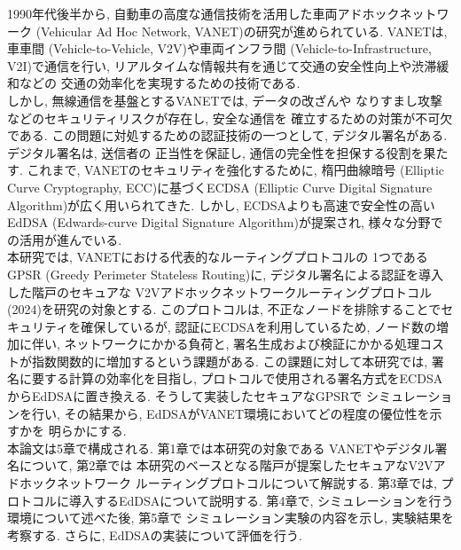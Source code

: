 1990年代後半から, 自動車の高度な通信技術を活用した車両アドホックネットワーク
 (Vehicular Ad Hoc Network, VANET)の研究が進められている. 
VANETは, 車車間 (Vehicle-to-Vehicle, V2V)や車両インフラ間
 (Vehicle-to-Infrastructure, V2I)で通信を行い, 
リアルタイムな情報共有を通じて交通の安全性向上や渋滞緩和などの
交通の効率化を実現するための技術である. \\
\indent しかし, 無線通信を基盤とするVANETでは, データの改ざんや
なりすまし攻撃などのセキュリティリスクが存在し, 安全な通信を
確立するための対策が不可欠である. この問題に対処するための認証技術の一つとして, 
デジタル署名がある. デジタル署名は, 送信者の
正当性を保証し, 通信の完全性を担保する役割を果たす. これまで, 
VANETのセキュリティを強化するために, 楕円曲線暗号 
(Elliptic Curve Cryptography, ECC)に基づくECDSA 
(Elliptic Curve Digital Signature Algorithm)が広く用いられてきた\cite{ravi}. 
しかし, ECDSAよりも高速で安全性の高いEdDSA 
(Edwards-curve Digital Signature Algorithm)が提案され, 
様々な分野での活用が進んでいる. \\
\indent 本研究では, VANETにおける代表的なルーティングプロトコルの
1つであるGPSR (Greedy Perimeter Stateless Routing)に, 
デジタル署名による認証を導入した階戸のセキュアな
V2Vアドホックネットワークルーティングプロトコル (2024)を研究の対象とする. 
このプロトコルは, 不正なノードを排除することでセキュリティを確保しているが, 
認証にECDSAを利用しているため, ノード数の増加に伴い, ネットワークにかかる負荷と, 
署名生成および検証にかかる処理コストが指数関数的に増加するという課題がある. 
この課題に対して本研究では, 署名に要する計算の効率化を目指し,  
プロトコルで使用される署名方式をECDSAからEdDSAに置き換える. そうして実装したセキュアなGPSRで
シミュレーションを行い, その結果から, EdDSAがVANET環境においてどの程度の優位性を示すかを
明らかにする. \\
\indent 本論文は5章で構成される. 第1章では本研究の対象である
VANETやデジタル署名について, 第2章では
本研究のベースとなる階戸が提案したセキュアなV2Vアドホックネットワーク
ルーティングプロトコル\cite{shinato}について解説する. 第3章では, 
プロトコルに導入するEdDSAについて説明する. 第4章で, 
シミュレーションを行う環境について述べた後, 第5章で
シミュレーション実験の内容を示し, 実験結果を考察する. 
さらに, EdDSAの実装について評価を行う. 

